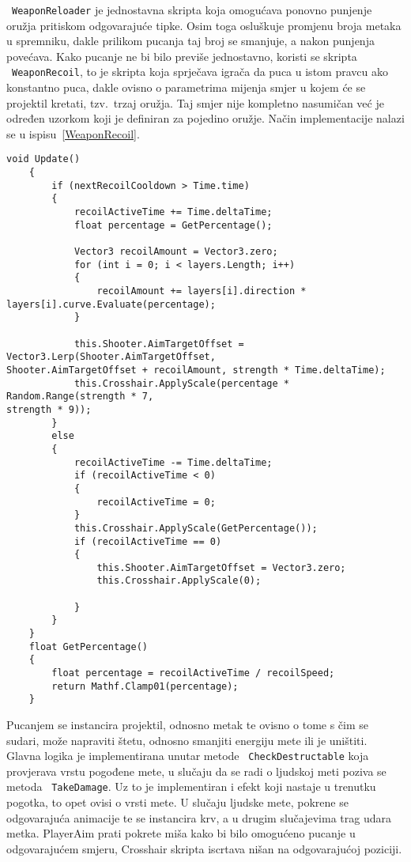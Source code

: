 ~\texttt{WeaponReloader} je jednostavna skripta koja omogućava ponovno punjenje oružja
pritiskom odgovarajuće tipke. Osim toga osluškuje promjenu broja metaka u spremniku,
dakle prilikom pucanja taj broj se smanjuje, a nakon punjenja povećava.
Kako pucanje ne bi bilo previše jednostavno, koristi se skripta ~\texttt{WeaponRecoil}, to je
skripta koja sprječava igrača da puca u istom pravcu ako konstantno puca, dakle
ovisno o parametrima mijenja smjer u kojem će se projektil kretati, tzv.~trzaj
oružja. Taj smjer nije kompletno nasumičan već je određen uzorkom koji je definiran
za pojedino oružje. Način implementacije nalazi se u ispisu~\ref{WeaponRecoil}.
\begin{lstlisting}[caption={Trzaj oružja tijekom pucanja}, label=WeaponRecoil]
    void Update()
    {
        if (nextRecoilCooldown > Time.time)
        {
            recoilActiveTime += Time.deltaTime;
            float percentage = GetPercentage();
          
            Vector3 recoilAmount = Vector3.zero;
            for (int i = 0; i < layers.Length; i++)
            {
                recoilAmount += layers[i].direction *
layers[i].curve.Evaluate(percentage);
            }

            this.Shooter.AimTargetOffset = Vector3.Lerp(Shooter.AimTargetOffset,
Shooter.AimTargetOffset + recoilAmount, strength * Time.deltaTime);
            this.Crosshair.ApplyScale(percentage * Random.Range(strength * 7,
strength * 9));
        }
        else
        {
            recoilActiveTime -= Time.deltaTime;
            if (recoilActiveTime < 0)
            {
                recoilActiveTime = 0;
            }
            this.Crosshair.ApplyScale(GetPercentage());
            if (recoilActiveTime == 0)
            {
                this.Shooter.AimTargetOffset = Vector3.zero;
                this.Crosshair.ApplyScale(0);

            }
        }
    }
    float GetPercentage()
    {
        float percentage = recoilActiveTime / recoilSpeed;
        return Mathf.Clamp01(percentage);
    }
\end{lstlisting}

Pucanjem se instancira projektil, odnosno metak te ovisno o tome s
čim se sudari, može napraviti štetu, odnosno smanjiti energiju mete ili je uništiti.
Glavna logika je implementirana unutar metode ~\texttt{CheckDestructable} koja provjerava vrstu pogođene mete, u slučaju da se radi o ljudskoj meti poziva se metoda ~\texttt{TakeDamage}.
Uz to je implementiran i efekt koji nastaje u trenutku pogotka, to opet ovisi o vrsti mete. U slučaju ljudske mete, pokrene se odgovarajuća animacije te se instancira krv, a u drugim slučajevima trag udara metka.
PlayerAim prati pokrete miša kako bi bilo omogućeno pucanje u odgovarajućem smjeru,
Crosshair skripta iscrtava nišan na odgovarajućoj poziciji.
